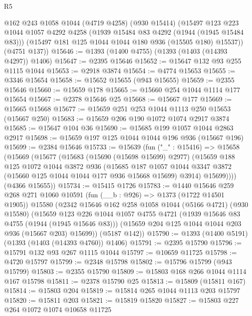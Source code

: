 \begin{lexlean}{R5}
\begin{coremodule}
      @162
      @243
      @1058
      @1044
      (@4719 @4258)
      (@930 @15414)
      (@15497
        @123
        @223
        @1044
        @1057
        @4292
        @4258
        (@1939 @15484 @83 @4292 (@1944 (@1945 @15484 @83)))
        (@15497 @181 @125 @1044 @1044 @180 @936 (@15505 @180) @15537))
      (@4751 @137))
@15646 := @1393 (@1400 @4755) (@1393 (@1403 (@14393 @4297)) @1406)
@15647 := @2395 @15646
@15652 := @15647 @132 @93 @255 @1115 @1044
@15653 := @2918 @3874
@15654 := @4774 @15653
@15655 := @3346 @15654
@15658 := @15652 @15655 (@943 @15655)
@15659 := @2355 @15646
@15660 := @15659 @178
@15665 := @15660 @254 @1044 @1114 @177 @15654
@15667 := @2378 @15646 @25
@15668 := @15667 @177
@15669 := @15665 @15668
@15677 := @15659 @251 @253 @1044 @1113 @250 @15653 (@15667 @250)
@15683 := @15659 @206 @190 @1072 @1074 @2917 @3874
@15685 := @15647 @104 @36
@15690 := @15685 @199 @1057 @1044 @2863 @2917
@15698 := @15659 @197 @125 @1044 @1044 @196 @936 (@15667 @196)
@15699 := @2384 @15646
@15733 := @15639
    (fun ("_" : @15416) =>
    @15658
      (@15669
        (@15677
          (@15683
            (@15690 (@15698 @15699) @2977)
            (@15659
              @188
              @125
              @1072
              @1044
              @3872
              @936
              (@15685
                @187
                @1057
                @1044
                @3347
                @3872
                (@15660 @125 @1044 @1044 @177 @936 @15668 @15699)
                @3914)
              @15699))))
      (@4366 @15655))
@15734 := @15415 @1726
@15783 := @1440
    @15646
    @259
    @268
    @271
    @1060
    @10591
    (fun (__b : @926) => @1373 (@1722 @14501 @1905))
    @15580
    (@2342
      @15646
      @162
      @258
      @1058
      @1044
      (@5166 @4721)
      (@930 @15580)
      (@15659
        @123
        @226
        @1044
        @1057
        @4755
        @4721
        (@1939 @15646 @83 @4755 (@1944 (@1945 @15646 @83)))
        (@15659 @204 @125 @1044 @1044 @203 @936 (@15667 @203) @15699))
      (@5187 @142))
@15790 := @1393 (@1400 @5191) (@1393 (@1403 (@14393 @4760)) @1406)
@15791 := @2395 @15790
@15796 := @15791 @132 @93 @267 @1115 @1044
@15797 := @10659 @11725
@15798 := @4720 @15797
@15799 := @2348 @15798
@15802 := @15796 @15799 (@943 @15799)
@15803 := @2355 @15790
@15809 := @15803 @168 @266 @1044 @1114 @167 @15798
@15811 := @2378 @15790 @25
@15813 := @15809 (@15811 @167)
@15814 := @15803 @204
@15819 := @15814 @265 @1044 @1113 @203 @15797
@15820 := @15811 @203
@15821 := @15819 @15820
@15827 := @15803 @227 @264 @1072 @1074 @10658 @11725

\end{coremodule}
\end{lexlean}
